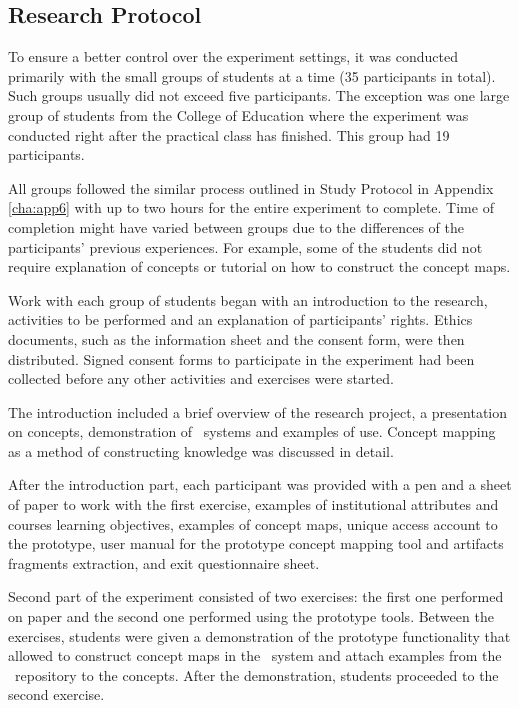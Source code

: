 \subsection{Research Protocol}

To ensure a better control over the experiment settings, it was conducted
primarily with the small groups of students at a time (35 participants in
total). Such groups usually did not exceed five participants. The exception was
one large group of students from the College of Education where the experiment
was conducted right after the practical class has finished. This group had 19
participants. 

All groups followed the similar process outlined in Study Protocol
in Appendix \ref{cha:app6} with up to two hours for the entire experiment to
complete. Time of completion might have varied between groups due to the
differences of the participants' previous experiences. For example, some of the
students did not require explanation of \LLLs concepts or tutorial on how to
construct the concept maps.

Work with each group of students began with an introduction to the research,
activities to be performed and an explanation of participants' rights.
Ethics documents, such as the information sheet and the consent form, were then
distributed. Signed consent forms to participate in the experiment had been
collected before any other activities and exercises were started.

The introduction included a brief overview of the research project, a
presentation on \LLLs concepts, demonstration of \ep~systems and examples of
use. Concept mapping as a method of constructing knowledge was discussed in
detail.

After the introduction part, each participant was provided with a pen and a
sheet of paper to work with the first exercise, examples of institutional
attributes and courses learning objectives, examples of concept maps, unique
access account to the prototype, user manual for the prototype concept mapping
tool and artifacts fragments extraction, and exit questionnaire sheet.

Second part of the experiment consisted of two exercises: the first one
performed on paper and the second one performed using the prototype tools.
Between the exercises, students were given a demonstration of the prototype
functionality that allowed to construct concept maps in the \ep~system and
attach examples from the \ep~repository to the concepts. After the
demonstration, students proceeded to the second exercise.

